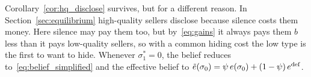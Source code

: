 Corollary~\ref{cor:hq_disclose} survives, but for a different reason. In Section~\ref{sec:equilibrium} high-quality sellers disclose because silence costs them money. Here silence may pay them too, but by~\eqref{eq:gains} it always pays them $b$ less than it pays low-quality sellers, so with a common hiding cost the low type is the first to want to hide. Whenever $\sigma_1^*=0$, the belief reduces to~\eqref{eq:belief_simplified} and the effective belief to $\tilde e(\sigma_0)=\psi\,e(\sigma_0)+(1-\psi)\,e^{\rm def}$.
